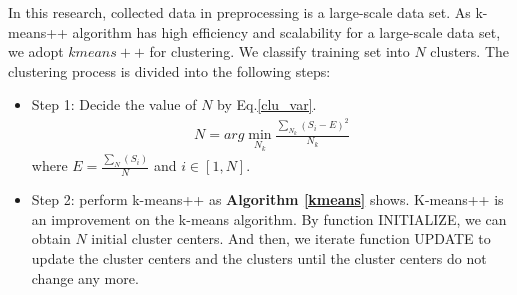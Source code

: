In this research, collected data in preprocessing is a large-scale data set. As k-means++ algorithm has high efficiency and scalability for a large-scale data set, we adopt $kmeans++$ for clustering. We classify training set into $N$ clusters. The clustering process is divided into the following steps:
\begin{itemize}
	\item Step 1: Decide the value of $N$ by Eq.\ref{clu_var}.
	\begin{eqnarray}\label{clu_var}
		N=arg\min \limits_{N_{k}}{\frac{\sum _{N_{k}}(S_{i}-E)^{2}}{N_{k}}}
	\end{eqnarray}
	where $E = \frac{\sum _{N}(S_{i})}{N}$ and $i\in [1,N]$.
	\item Step 2: perform k-means++ as \textbf{Algorithm \ref{kmeans}} shows. K-means++ is an improvement on the k-means algorithm. By function INITIALIZE, we can obtain $N$ initial cluster centers. And then, we iterate function UPDATE to update the cluster centers and the clusters until the cluster centers do not change any more.

\end{itemize}
